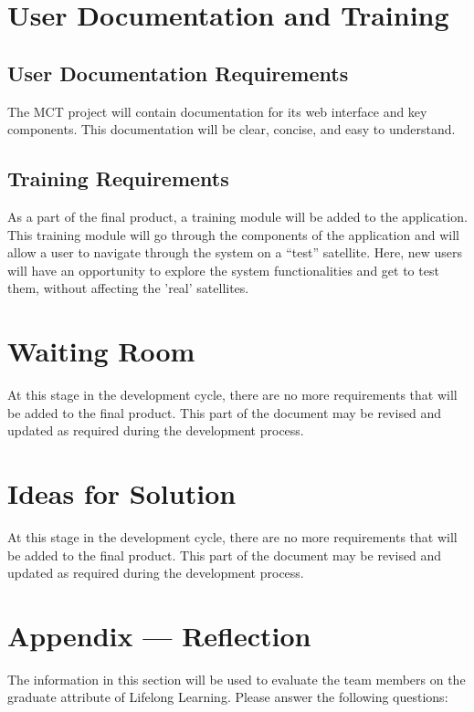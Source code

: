 \documentclass[12pt]{article}
\begin{document}
\section{User Documentation and Training}
\subsection{User Documentation Requirements}
 The MCT project will contain documentation for its web interface and key components. This documentation will be clear, concise, and easy to understand.

\subsection{Training Requirements}
As a part of the final product, a training module will be added to the application. This training module will go through the components of the application and will allow a user to navigate through the system on a “test” satellite. Here, new users will have an opportunity to explore the system functionalities and get to test them, without affecting the 'real' satellites. 

\section{Waiting Room}
At this stage in the development cycle, there are no more requirements that will be added to the final product. This part of the document may be revised and updated as required during the development process.


\section{Ideas for Solution}
At this stage in the development cycle, there are no more requirements that will be added to the final product. This part of the document may be revised and updated as required during the development process.

\newpage{}
\section*{Appendix --- Reflection}

The information in this section will be used to evaluate the team members on the
graduate attribute of Lifelong Learning.  Please answer the following questions:
\end{document}
